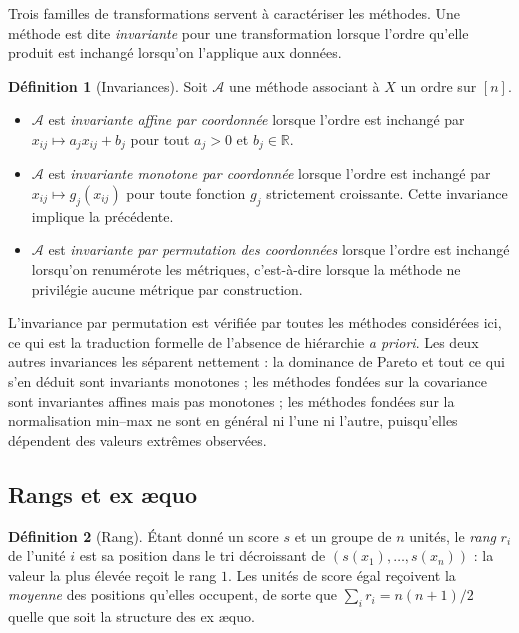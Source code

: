 \documentclass[11pt,a4paper]{article}
\theoremstyle{definition}
\newtheorem{definition}{Définition}[section]
\theoremstyle{remark}
\newcommand{\R}{\mathbb{R}}
\begin{document}
\medskip

Trois familles de transformations servent à caractériser les méthodes. Une méthode est
dite \emph{invariante} pour une transformation lorsque l'ordre qu'elle produit est
inchangé lorsqu'on l'applique aux données.

\medskip

\begin{definition}[Invariances]
  \label{def:invariances}
  Soit $\mathcal{A}$ une méthode associant à $X$ un ordre sur $[n]$.

  \medskip

  \begin{itemize}[nosep,leftmargin=1.4em]
    \item $\mathcal{A}$ est \emph{invariante affine par coordonnée} lorsque l'ordre est
    inchangé par $x_{ij} \mapsto a_j x_{ij} + b_j$ pour tout $a_j > 0$ et $b_j \in \R$.
    \item $\mathcal{A}$ est \emph{invariante monotone par coordonnée} lorsque l'ordre est
    inchangé par $x_{ij} \mapsto g_j(x_{ij})$ pour toute fonction $g_j$ strictement
    croissante. Cette invariance implique la précédente.
    \item $\mathcal{A}$ est \emph{invariante par permutation des coordonnées} lorsque
    l'ordre est inchangé lorsqu'on renumérote les métriques, c'est-à-dire lorsque la
    méthode ne privilégie aucune métrique par construction.
  \end{itemize}
\end{definition}

\bigskip

L'invariance par permutation est vérifiée par toutes les méthodes considérées ici, ce qui
est la traduction formelle de l'absence de hiérarchie \emph{a priori}. Les deux autres
invariances les séparent nettement : la dominance de Pareto et tout ce qui s'en déduit
sont invariants monotones ; les méthodes fondées sur la covariance sont invariantes
affines mais pas monotones ; les méthodes fondées sur la normalisation min--max ne sont
en général ni l'une ni l'autre, puisqu'elles dépendent des valeurs extrêmes observées.

\bigskip

\subsection{Rangs et ex \ae quo}

\medskip

\begin{definition}[Rang]
  \label{def:rang}
  Étant donné un score $s$ et un groupe de $n$ unités, le \emph{rang} $r_i$ de l'unité $i$
  est sa position dans le tri décroissant de $(s(x_1),\dots,s(x_n))$ : la valeur la plus
  élevée reçoit le rang $1$. Les unités de score égal reçoivent la \emph{moyenne} des
  positions qu'elles occupent, de sorte que $\sum_i r_i = n(n+1)/2$ quelle que soit la
  structure des ex \ae quo.
\end{definition}
\end{document}
